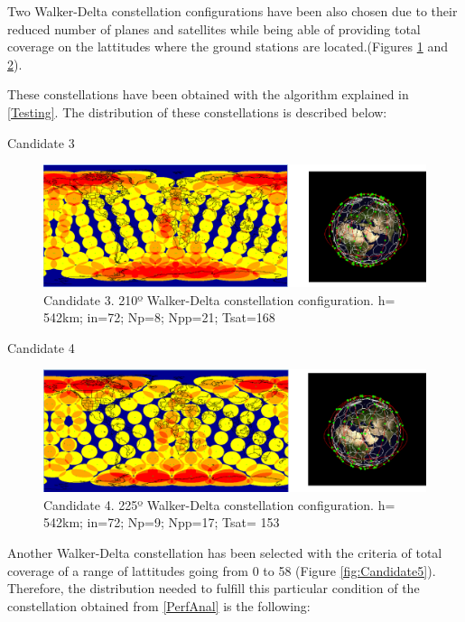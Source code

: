 Two Walker-Delta constellation configurations have been also chosen due to their reduced number of planes and satellites while being able of providing total coverage on the lattitudes where the ground stations are located.(Figures \ref{fig:Candidate3} and \ref{fig:Candidate4}).

These constellations have been obtained with the algorithm explained in \ref{Testing}. The distribution of these constellations is described below:

Candidate 3

\begin{figure}[H]%
	\centering
	\includegraphics[width=1\textwidth]{Candidate3.png}
	\caption{Candidate 3. 210º Walker-Delta constellation configuration. h= 542km; in=72; Np=8; Npp=21; Tsat=168 }
	\label{fig:Candidate3}
\end{figure}

Candidate 4

\begin{figure}[H]%
	\centering
	\includegraphics[width=1\textwidth]{Candidate4.png}
	\caption{Candidate 4. 225º Walker-Delta constellation configuration.
			 h= 542km; in=72; Np=9; Npp=17; Tsat= 153}
	\label{fig:Candidate4}
\end{figure}


Another Walker-Delta constellation has been selected with the criteria of total coverage of a range of lattitudes going from 0 to 58 (Figure \ref{fig:Candidate5}). Therefore, the distribution needed to fulfill this particular condition of the constellation obtained from \ref{PerfAnal} is the following:

